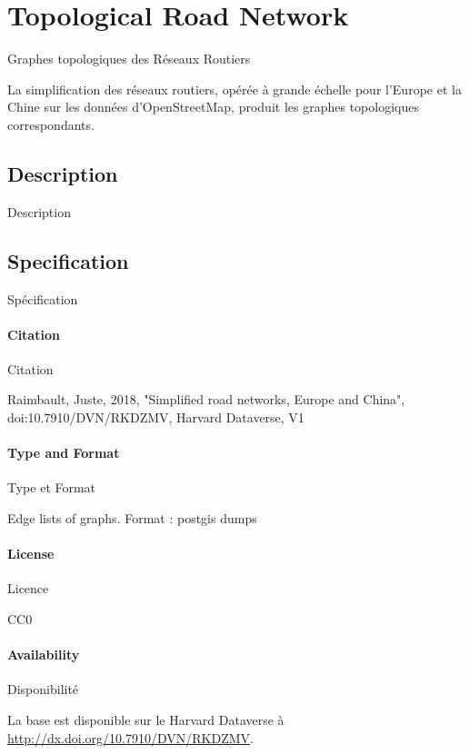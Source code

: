 \section{Topological Road Network}{Graphes topologiques des Réseaux Routiers}

La simplification des réseaux routiers, opérée à grande échelle pour l'Europe et la Chine sur les données d'OpenStreetMap, produit les graphes topologiques correspondants. 


\subsection{Description}{Description}




\subsection{Specification}{Spécification}

\paragraph{Citation}{Citation} 

Raimbault, Juste, 2018, "Simplified road networks, Europe and China", doi:10.7910/DVN/RKDZMV, Harvard Dataverse, V1

\paragraph{Type and Format}{Type et Format}

Edge lists of graphs. Format : postgis dumps

\paragraph{License}{Licence}

CC0

\paragraph{Availability}{Disponibilité}

La base est disponible sur le Harvard Dataverse à \url{http://dx.doi.org/10.7910/DVN/RKDZMV}.






